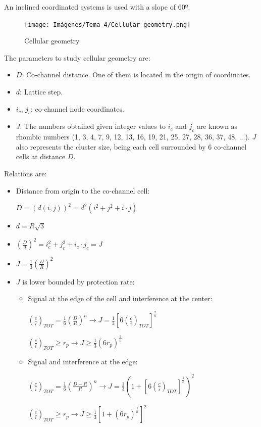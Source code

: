 \documentclass[
	12pt,
	twoside
]{book}
\begin{document}
An inclined coordinated systems is used with a slope of 60º.

\begin{figure}[H]
	\centering
	\texttt{[image: Imágenes/Tema 4/Cellular geometry.png]}
	\caption{
		\label{fig:unit4_cell_geometry}
		Cellular geometry
	}
\end{figure}

The parameters to study cellular geometry are:
\begin{itemize}
	\item $D$: Co-channel distance. One of them is located in the origin of coordinates.
	\item $d$: Lattice step.
	\item $i_c$, $j_c$: co-channel node coordinates.
	\item $J$: The numbers obtained given integer values to $i_c$ and $j_c$ are known as rhombic numbers (1, 3, 4, 7, 9, 12, 13, 16, 19, 21, 25, 27, 28, 36, 37, 48, ...). $J$ also represents the cluster size, being each cell surrounded by 6 co-channel cells at distance $D$.
\end{itemize}

Relations are:
\begin{itemize}
	\item {
		Distance from origin to the co-channel cell:

		$D = \left( d(i, j) \right)^2 = d^2 (i^2 + j^2 + i \cdot j)$
	}
	\item $d = R \sqrt{3}$
	\item $\left( \frac {D} {d} \right)^2 = i_{c}^2 + j_{c}^2 + i_{c} \cdot j_{c} = J$
	\item $J = \frac {1} {3} \left( \frac {D} {R} \right)^2$
	\item {
		$J$ is lower bounded by protection rate:
		\begin{itemize}
			\item {
				Signal at the edge of the cell and interference at the center:

				$\left( \frac {c} {i} \right)_{TOT} = \frac {1} {6} \left( \frac {D} {R} \right)^n \rightarrow J = \frac {1} {3} \left[ 6 \left( \frac {c} {i} \right)_{TOT} \right]^{\frac {2} {n}}$

				$\left( \frac {c} {i} \right)_{TOT} \geq r_p \rightarrow J \geq \frac {1} {3} \left( 6 r_p \right)^{\frac{2}{n}}$
			}
			\item {
				Signal and interference at the edge:

				$\left( \frac {c} {i} \right)_{TOT} = \frac {1} {6} \left( \frac {D - R} {R} \right)^n \rightarrow J = \frac {1} {3} \left( 1 + \left[ 6 \left( \frac {c} {i} \right)_{TOT} \right]^{\frac {1} {n}} \right)^2$

				$\left( \frac {c} {i} \right)_{TOT} \geq r_p \rightarrow J \geq \frac {1} {3} \left[ 1 + \left( 6 r_p \right)^{\frac{1}{n}} \right]^2$
			}
		\end{itemize}
	}
\end{itemize}
\end{document}
